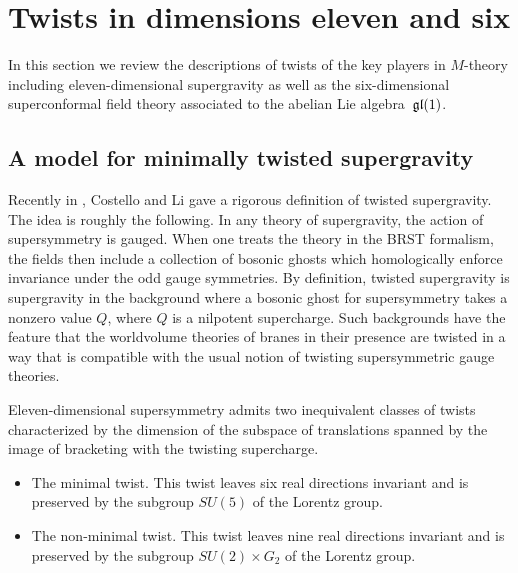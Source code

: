%

%
%
%

\section{Twists in dimensions eleven and six}
\label{s:twisted}

In this section we review the descriptions of twists of the key players in $M$-theory including eleven-dimensional supergravity as well as the six-dimensional superconformal field theory associated to the abelian Lie algebra~$\mathfrak{gl}(1)$.

\subsection{A model for minimally twisted supergravity}


Recently in \cite{CLsugra}, Costello and Li gave a rigorous definition of twisted supergravity.
The idea is roughly the following.
In any theory of supergravity, the action of supersymmetry is gauged. 
When one treats the theory in the BRST formalism, the fields then include a collection of bosonic ghosts which homologically enforce invariance under the odd gauge symmetries.
By definition, twisted supergravity is supergravity in the background where a bosonic ghost for supersymmetry takes a nonzero value $Q$, where $Q$ is a nilpotent supercharge. 
Such backgrounds have the feature that the worldvolume theories of branes in their presence are twisted in a way that is compatible with the usual notion of twisting supersymmetric gauge theories.

Eleven-dimensional supersymmetry admits two inequivalent classes of twists characterized by the dimension of the subspace of translations spanned by the image of bracketing with the twisting supercharge.
\begin{itemize}
\item 
The minimal twist. 
This twist leaves six real directions invariant and is preserved by the subgroup $SU(5)$ of the Lorentz group. 
\item 
The non-minimal twist. 
This twist leaves nine real directions invariant and is preserved by the subgroup $SU(2) \times G_2$ of the Lorentz group. 
\end{itemize}

